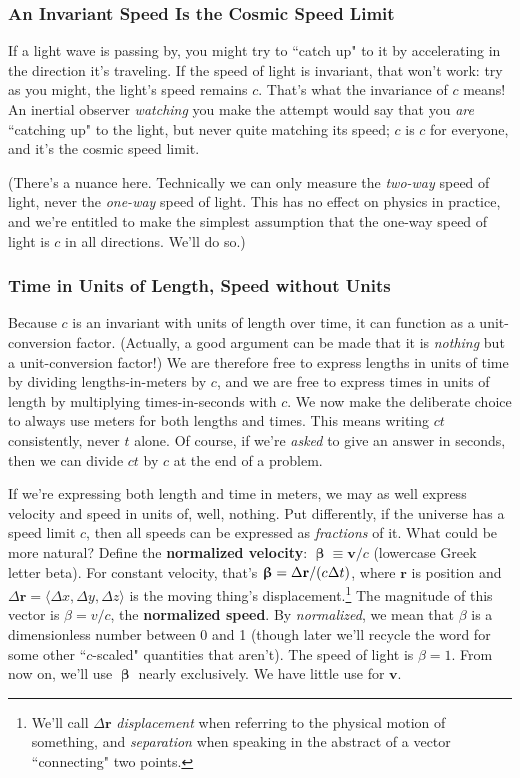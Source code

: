 \documentclass[12pt]{article}
\renewcommand{\vv}[1]{\mathbf{#1}}
\newcommand{\vvbeta}{\bm{\upbeta}}
\begin{document}
\subsubsection{An Invariant Speed Is the Cosmic Speed Limit}

If a light wave is passing by, you might try to ``catch up" to it by accelerating in the direction it's traveling. If the speed of light is invariant, that won't work: try as you might, the light's speed remains $c$. That's what the invariance of $c$ means! An inertial observer \emph{watching} you make the attempt would say that you \emph{are} ``catching up" to the light, but never quite matching its speed; $c$ is $c$ for everyone, and it's the cosmic speed limit.

(There's a nuance here. Technically we can only measure the \emph{two-way} speed of light, never the \emph{one-way} speed of light. This has no effect on physics in practice, and we're entitled to make the simplest assumption that the one-way speed of light is $c$ in all directions. We'll do so.)


\subsubsection{Time in Units of Length, Speed without Units}

Because $c$ is an invariant with units of length over time, it can function as a unit-conversion factor. (Actually, a good argument can be made that it is \emph{nothing} but a unit-conversion factor!) We are therefore free to express lengths in units of time by dividing lengths-in-meters by $c$, and we are free to express times in units of length by multiplying times-in-seconds with $c$. We now make the deliberate choice to always use meters for both lengths and times. This means writing $ct$ consistently, never $t$ alone. Of course, if we're \emph{asked} to give an answer in seconds, then we can divide $ct$ by $c$ at the end of a problem.

If we're expressing both length and time in meters, we may as well express velocity and speed in units of, well, nothing. Put differently, if the universe has a speed limit $c$, then all speeds can be expressed as \emph{fractions} of it. What could be more natural? Define the \textbf{normalized velocity}: $\vvbeta \equiv \vv v / c$ (lowercase Greek letter beta). For constant velocity, that's  $\vvbeta = \Delta \vv r / (c \mkern.5mu \Delta t)$, where $\vv r$ is position and ${\Delta \vv r = \langle \Delta x, \Delta y, \Delta z \rangle}$ is the moving thing's displacement.\footnote{We'll call $\Delta \vv r$ \emph{displacement} when referring to the physical motion of something, and \emph{separation} when speaking in the abstract of a vector ``connecting" two points.} The magnitude of this vector is $\beta = v / c$, the \textbf{normalized speed}. By \emph{normalized}, we mean that $\beta$ is a dimensionless number between 0 and 1 (though later we'll recycle the word for some other ``$c$-scaled" quantities that aren't). The speed of light is $\beta = 1$. From now on, we'll use $\vvbeta$ nearly exclusively. We have little use for $\vv v$.
\end{document}
